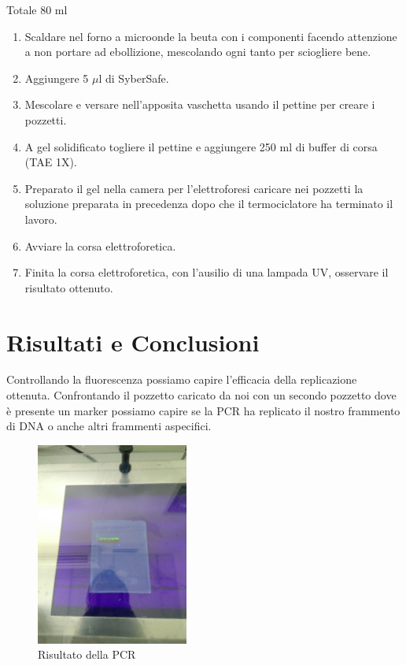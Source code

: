 Totale 80 ml
\begin{enumerate}
\item Scaldare nel forno a microonde la beuta con i componenti facendo attenzione a
non portare ad ebollizione, mescolando ogni tanto per sciogliere bene.
\item Aggiungere 5 $\mu$l di SyberSafe.
\item Mescolare e versare nell’apposita vaschetta
usando il pettine per creare i pozzetti.
\item A gel solidificato togliere il pettine e
aggiungere 250 ml di buffer di corsa (TAE 1X).

\item Preparato il gel nella camera per l’elettroforesi caricare nei pozzetti la
soluzione preparata in precedenza dopo che il termociclatore ha terminato il
lavoro.
\item Avviare la corsa elettroforetica.

\item Finita la corsa elettroforetica, con l’ausilio di una lampada UV, osservare il
risultato ottenuto.

\end{enumerate}


\section{Risultati e Conclusioni}

Controllando la fluorescenza possiamo capire l'efficacia della replicazione
ottenuta. Confrontando il pozzetto caricato da noi con un secondo pozzetto
dove è presente un marker possiamo capire se la PCR ha replicato il nostro
frammento di DNA o anche altri frammenti aspecifici.

\begin{figure}[htbp]
	\includegraphics[width=50mm]{./immagini/risultato_pcr.jpg}
	\caption{Risultato della PCR}
	\label{risultato_pcr}
\end{figure}
